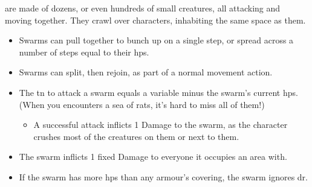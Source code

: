 \iftoggle{examplecharacter}{}{Swarms} are made of dozens, or even hundreds of small creatures, all attacking and moving together.
They crawl over characters, inhabiting the same space as them.

\begin{itemize}
  \item
  Swarms can pull together to bunch up on a single \gls{step}, or spread across a number of \glspl{step} equal to their \glspl{hp}.
  \item
  Swarms can split, then rejoin, as part of a normal movement action.
  \item
  The \gls{tn} to attack a swarm equals a variable minus the swarm's current \glspl{hp}.
  (When you encounters a sea of rats, it's hard to miss all of them!)
  \begin{itemize}
    \item
    A successful attack inflicts 1 Damage to the swarm, as the character crushes most of the creatures on them or next to them.
  \end{itemize}
  \item
  The swarm inflicts 1 fixed Damage to everyone it occupies an area with.
  \item
  If the swarm has more \glspl{hp} than any armour's \gls{covering}, the swarm ignores \gls{dr}.
\end{itemize}

